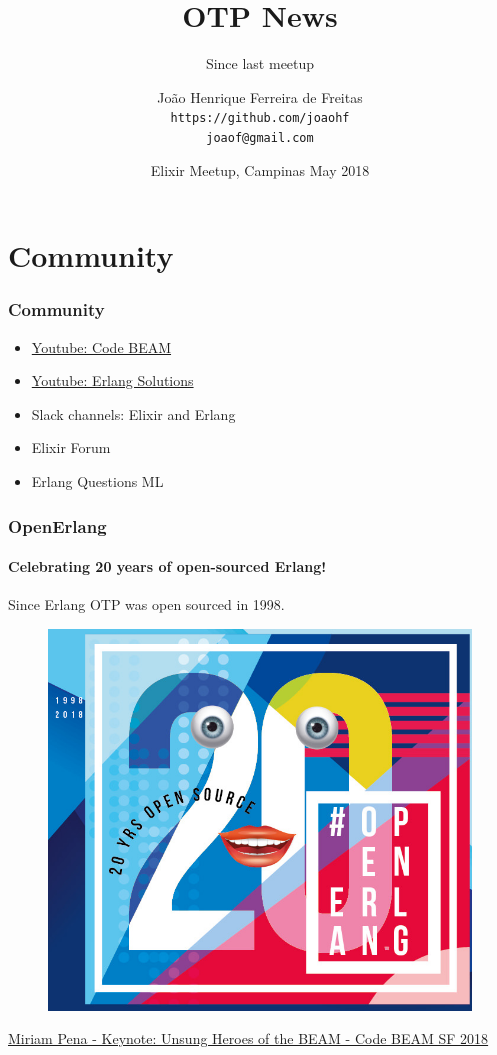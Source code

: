 \documentclass{beamer}
\title{OTP News}
\subtitle{Since last meetup}
\author[joaohf]{João Henrique Ferreira de Freitas \\ \texttt{https://github.com/joaohf} \\ \texttt{joaof@gmail.com}}
\date[EMC May 2018]{Elixir Meetup, Campinas May 2018}
\begin{document}
  \begin{frame}
    \titlepage
  \end{frame}

  \section[Section]{Community}
  
  \begin{frame}
    \frametitle{Community}
    \begin{itemize}
      \item \href{https://www.youtube.com/channel/UC47eUBNO8KBH_V8AfowOWOw}{Youtube: Code BEAM}
      \item \href{https://www.youtube.com/channel/UCKrD_GYN3iDpG_uMmADPzJQ}{Youtube: Erlang Solutions}      
      \item Slack channels: Elixir and Erlang
      \item Elixir Forum
      \item Erlang Questions ML
    \end{itemize}
  \end{frame}
  
  \begin{frame}
    \frametitle{OpenErlang}
    \framesubtitle{Celebrating 20 years of open-sourced Erlang!}

    \begin{block}{}
    Since Erlang OTP was open sourced in 1998.
    \begin{figure}[t]
    \includegraphics[scale=0.1]{img/20.png}
    \centering
    \end{figure}
    \end{block}
    
    \pause
    
    \begin{alertblock}{}   
    \href{https://www.youtube.com/watch?v=j6wbuV8pMx8}{Miriam Pena - Keynote: Unsung Heroes of the BEAM - Code BEAM SF 2018}
    \end{alertblock}
  \end{frame}
  
\end{document}

